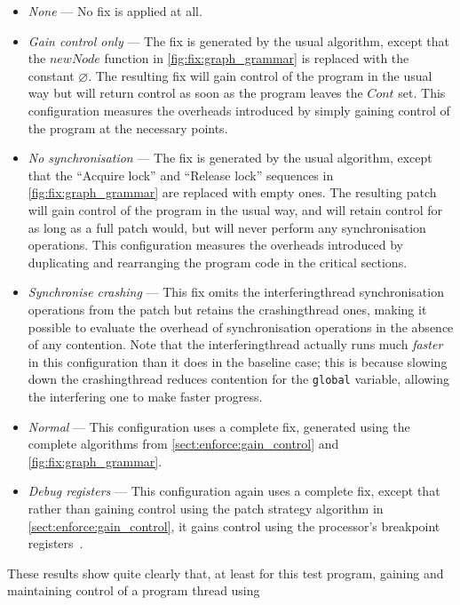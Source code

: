 \begin{itemize}
\item \textit{None} --- No fix is applied at all.
\item \textit{Gain control only} --- The fix is generated by the usual
  algorithm, except that the $\mathit{newNode}$ function in
  \autoref{fig:fix:graph_grammar} is replaced with the constant
  $\varnothing$.  The resulting fix will gain control of the program
  in the usual way but will return control as soon as the program
  leaves the $\mathit{Cont}$ set.  This configuration measures the
  overheads introduced by simply gaining control of the program at the
  necessary points.
\item \textit{No synchronisation} --- The fix is generated by the
  usual algorithm, except that the ``Acquire lock'' and ``Release
  lock'' sequences in \autoref{fig:fix:graph_grammar} are replaced
  with empty ones.  The resulting patch will gain control of the
  program in the usual way, and will retain control for as long as a
  full patch would, but will never perform any synchronisation
  operations.  This configuration measures the overheads introduced by
  duplicating and rearranging the program code in the critical
  sections.
\item \textit{Synchronise crashing} --- This fix omits the
  \gls{interferingthread} synchronisation operations from the patch
  but retains the \gls{crashingthread} ones, making it possible to
  evaluate the overhead of synchronisation operations in the absence
  of any contention.  Note that the \gls{interferingthread} actually
  runs much \emph{faster} in this configuration than it does in the
  baseline case; this is because slowing down the \gls{crashingthread}
  reduces contention for the \texttt{global} variable, allowing the
  interfering one to make faster progress.
\item \textit{Normal} --- This configuration uses a complete fix,
  generated using the complete algorithms from
  \autoref{sect:enforce:gain_control} and
  \autoref{fig:fix:graph_grammar}.
\item \textit{Debug registers} --- This configuration again uses a
  complete fix, except that rather than gaining control using the
  patch strategy algorithm in \autoref{sect:enforce:gain_control}, it
  gains control using the processor's breakpoint
  registers~\cite[Chapter 16.2: Debug Registers]{Intel2009}.
\end{itemize}
These results show quite clearly that, at least for this test program,
gaining and maintaining control of a program thread using
